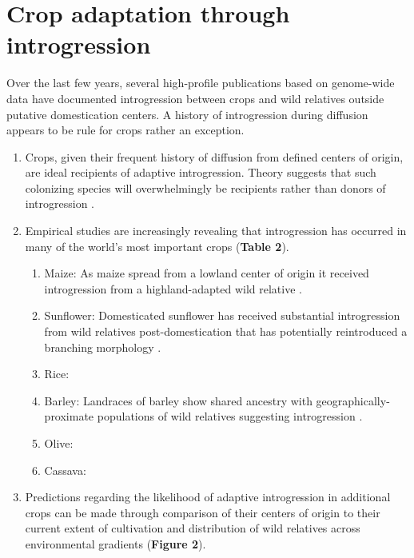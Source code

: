 \documentclass[11pt]{article}
\begin{document}
\section*{Crop adaptation through introgression}
Over the last few years, several high-profile publications based on genome-wide data have documented introgression between crops and wild relatives outside putative domestication centers. A history of introgression during diffusion appears to be rule for crops rather an exception.
\begin{enumerate}
	\item{Crops, given their frequent history of diffusion from defined centers of origin, are ideal recipients of adaptive introgression. Theory suggests that such colonizing species will overwhelmingly be recipients rather than donors of introgression \cite{Currat2008}.}
	\item{Empirical studies are increasingly revealing that introgression has occurred in many of the world's most important crops (\textbf{Table 2}).}
	\begin{enumerate}
		\item{Maize: As maize spread from a lowland center of origin it received introgression from a highland-adapted wild relative \cite{Hufford2013}.}
		\item{Sunflower: Domesticated sunflower has received substantial introgression from wild relatives post-domestication that has potentially reintroduced a branching morphology \cite{Baute2015}.}
		\item{Rice: \cite{Huang2012}}
		\item{Barley: Landraces of barley show shared ancestry with geographically-proximate populations of wild relatives suggesting introgression \cite{Poets2015}.}
		\item{Olive: \cite{Diez2015}}
		\item{Cassava: \cite{Bredeson2016}}
	\end{enumerate}
	\item{Predictions regarding the likelihood of adaptive introgression in additional crops can be made through comparison of their centers of origin to their current extent of cultivation and distribution of wild relatives across environmental gradients (\textbf{Figure 2}).}
\end{enumerate}

\end{document}
